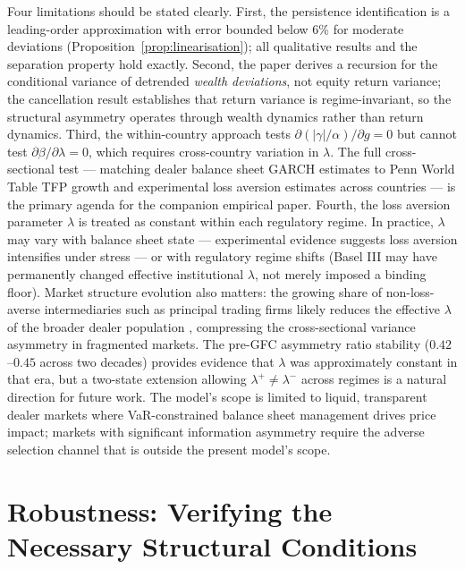 \documentclass[12pt,a4paper]{article}
\theoremstyle{definition}
\begin{document}
Four limitations should be stated clearly. First, the persistence
identification is a leading-order approximation with error bounded below
6\% for moderate deviations (Proposition~\ref{prop:linearisation}); all qualitative results
and the separation property hold exactly. Second, the paper derives a
recursion for the conditional variance of detrended \emph{wealth
deviations}, not equity return variance; the cancellation result
establishes that return variance is regime-invariant, so the structural
asymmetry operates through wealth dynamics rather than return dynamics.
Third, the within-country approach tests $\partial(|\gamma|/\alpha)/
\partial g = 0$ but cannot test $\partial\beta/\partial\lambda = 0$,
which requires cross-country variation in $\lambda$. The full
cross-sectional test --- matching dealer balance sheet GARCH estimates
to Penn World Table TFP growth and \citet{wang2017} experimental loss
aversion estimates across countries --- is the primary agenda for the
companion empirical paper. Fourth, the loss aversion parameter $\lambda$
is treated as constant within each regulatory regime. In practice,
$\lambda$ may vary with balance sheet state --- experimental evidence
suggests loss aversion intensifies under stress \citep{cohn2015} ---
or with regulatory regime shifts (Basel III may have permanently changed
effective institutional $\lambda$, not merely imposed a binding floor).
Market structure evolution also matters: the growing share of
non-loss-averse intermediaries such as principal trading firms likely
reduces the effective $\lambda$ of the broader dealer population
\citep{baron2019}, compressing the cross-sectional variance asymmetry
in fragmented markets. The pre-GFC asymmetry ratio stability
($0.42$--$0.45$ across two decades) provides evidence that $\lambda$
was approximately constant in that era, but a two-state extension
allowing $\lambda^+ \neq \lambda^-$ across regimes is a natural
direction for future work. The model's scope is limited to liquid, transparent dealer
markets where VaR-constrained balance sheet management drives price
impact; markets with significant information asymmetry require the
adverse selection channel that is outside the present model's scope.


\appendix

\section{Robustness: Verifying the Necessary Structural Conditions}
\label{app:robustness}
\end{document}
